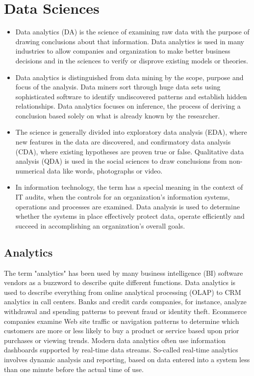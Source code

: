 \documentclass[]{report}
\begin{document}
  \newpage
\section*{Data Sciences}
\begin{itemize}
\item Data analytics (DA) is the science of examining raw data with the purpose of drawing conclusions about that information. Data analytics is used in many industries to allow companies and organization to make better business decisions and in the sciences to verify or disprove existing models or theories. 
\item Data analytics is distinguished from data mining by the scope, purpose and focus of the analysis. Data miners sort through huge data sets using sophisticated software to identify undiscovered patterns and establish hidden relationships. Data analytics focuses on inference, the process of deriving a conclusion based solely on what is already known by the researcher.

\item The science is generally divided into exploratory data analysis (EDA), where new features in the data are discovered, and confirmatory data analysis (CDA), where existing hypotheses are proven true or false. Qualitative data analysis (QDA) is used in the social sciences to draw conclusions from non-numerical data like words, photographs or video. 
\item In information technology, the term has a special meaning in the context of IT audits, when the controls for an organization's information systems, operations and processes are examined. Data analysis is used to determine whether the systems in place effectively protect data, operate efficiently and succeed in accomplishing an organization's overall goals.
\end{itemize}
    \subsection*{ Analytics }

The term "analytics" has been used by many business intelligence (BI) software vendors as a buzzword to describe quite different functions. Data analytics is used to describe everything from online analytical processing (OLAP) to CRM analytics in call centers. Banks and credit cards companies, for instance, analyze withdrawal and spending patterns to prevent fraud or identity theft. Ecommerce companies examine Web site traffic or navigation patterns to determine which customers are more or less likely to buy a product or service based upon prior purchases or viewing trends. Modern data analytics often use information dashboards supported by real-time data streams. So-called real-time analytics involves dynamic analysis and reporting, based on data entered into a system less than one minute before the actual time of use.
\end{document}
